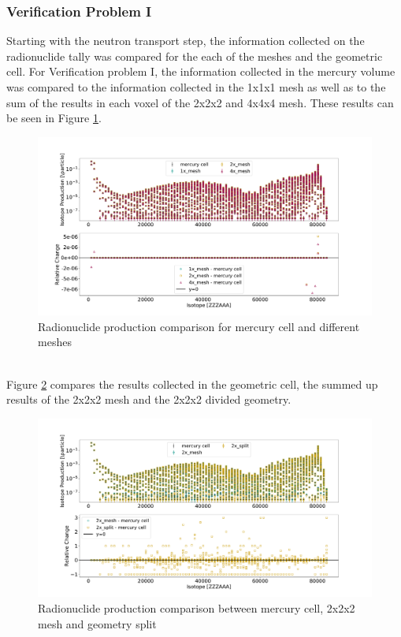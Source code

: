 \subsubsection{Verification Problem I}
Starting with the neutron transport step, the information collected on the
radionuclide tally was compared for the each of the meshes and the geometric
cell. For Verification problem I, the information collected in the mercury
volume was compared to the information collected in the 1x1x1 mesh as well
as to the sum of the results in each voxel of the 2x2x2 and 4x4x4 mesh. These
results can be seen in Figure \ref{fig:1prod_cell_1x_2x_4x}.
%
\begin{figure}[h!]
 \centering
 \includegraphics[scale=0.42,trim={2cm 1cm 3cm 2cm},clip]{../figs/toy_p1/prod_VPI_1x_2x_4x.pdf}
 \caption{Radionuclide production comparison for mercury cell and different meshes}
 \label{fig:1prod_cell_1x_2x_4x}
\end{figure}
%
\\
Figure \ref{fig:1prod_cell_2x} compares the results collected in the geometric
cell, the summed up results of the 2x2x2 mesh and the 2x2x2 divided geometry.
%
\begin{figure}[h!]
 \centering
 \includegraphics[scale=0.42,trim={3cm 1cm 3cm 3cm},clip]{../figs/toy_p1/prod_VPI_2x.pdf}
 \caption{Radionuclide production comparison between mercury cell, 2x2x2 mesh and geometry split}
 \label{fig:1prod_cell_2x}
\end{figure}
